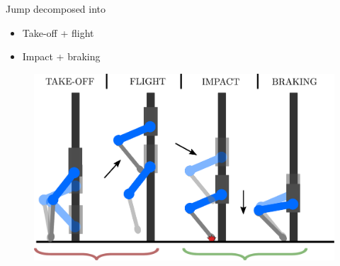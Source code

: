 \documentclass[aspectratio=169]{beamer}
\begin{document}


%


\begin{frame}
\begin{multicols}{2}
\vfill\null
Jump decomposed into
\begin{itemize}
\item Take-off + flight
\item Impact + braking
\end{itemize}
\vfill\null
\columnbreak
\vfill\null
\begin{figure}
    \centering
    \includegraphics[width=1.0\columnwidth]{beamer_imgs/impact_opt_intro/jump_phases.pdf}
\end{figure}
\end{multicols}
\end{frame}
\end{document}
